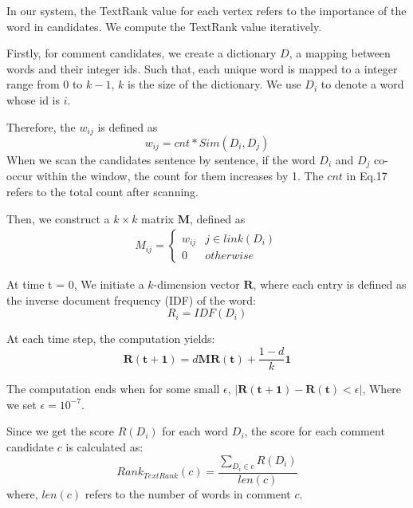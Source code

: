 \documentclass{sig-alternate}
\begin{document}
In our system, the TextRank value for each vertex refers to the importance of 
the word in candidates. We compute the TextRank value iteratively.

Firstly, for comment candidates, we create a dictionary $D$, a mapping between words 
and their integer ids. Such that, each unique word is mapped to a integer range 
from $0$ to $k-1$, $k$ is the size of the dictionary. We use $D_i$ to denote a 
word whose id is $i$.

Therefore, the $w_{ij}$ is defined as
\begin{equation}
  w_{ij} = cnt * Sim(D_i, D_j)
\end{equation}
When we scan the candidates sentence by sentence, if the word $D_i$ and $D_j$ 
co-occur within the window, the count for them increases by 1. The $cnt$ in Eq.17
refers to the total count after scanning.

Then, we construct a $k \times k$ matrix $\bm{M}$, defined as
\begin{equation}
  \begin{aligned}
    M_{ij} = \begin{cases} 
             w_{ij} & j \in link(D_i) \\
             0 & otherwise
             \end{cases}
  \end{aligned}
\end{equation}

At time t = 0, We initiate a $k$-dimension vector $\bm{R}$, where each entry is defined as the inverse document frequency (IDF) of the word: 
\begin{equation}
  R_i = IDF(D_i)
\end{equation}

At each time step, the computation yields:
\begin{equation}
  \bm{R(t+1)} = d\bm{M}\bm{R(t)} + \frac{1-d}{k} \bm{1}
\end{equation}

The computation ends when for some small $\epsilon$, $|\bm{R(t+1)} - \bm{R(t)} < \epsilon|$, Where we set $\epsilon = 10^{-7}$.

Since we get the score $R(D_i)$ for each word $D_i$, the score for each comment candidate $c$ is calculated as:
\begin{equation}
  Rank_{TextRank}(c) = \frac{\sum_{D_i \in c}{R(D_i)}}{len(c)} 
\end{equation}
where, $len(c)$ refers to the number of words in comment $c$.
\end{document}
